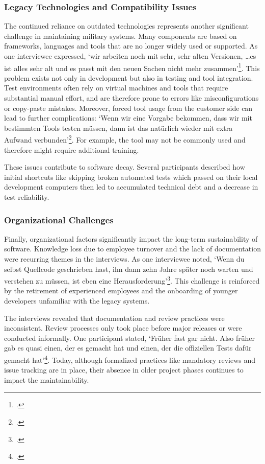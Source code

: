 \subsubsection{Legacy Technologies and Compatibility Issues}
The continued reliance on outdated technologies represents another significant challenge in maintaining military systems. Many components are based on frameworks, languages and tools that are no longer widely used or supported.
As one interviewee expressed, `wir arbeiten noch mit sehr, sehr alten Versionen, \ldots es ist alles sehr alt und es passt mit den neuen Sachen nicht mehr zusammen'\footcite{Interview12025}.
This problem exists not only in development but also in testing and tool integration. Test environments often rely on virtual machines and tools that require substantial manual effort, and are therefore prone to errors like misconfigurations or copy-paste mistakes.
Moreover, forced tool usage from the customer side can lead to further complications: `Wenn wir eine Vorgabe bekommen, dass wir mit bestimmten Tools testen müssen, dann ist das natürlich wieder mit extra Aufwand verbunden'\footcite{Interview32025}. For example, the tool may not be commonly used and therefore might require additional training.

These issues contribute to software decay. Several participants described how initial shortcuts like skipping broken automated tests which passed on their local development computers then led to accumulated technical debt and a decrease in test reliability.

\subsubsection{Organizational Challenges}
Finally, organizational factors significantly impact the long-term sustainability of software. Knowledge loss due to employee turnover and the lack of documentation were recurring themes in the interviews.
As one interviewee noted, `Wenn du selbst Quellcode geschrieben hast, ihn dann zehn Jahre später noch warten und verstehen zu müssen, ist eben eine Herausforderung'\footcite{Interview22025}. This challenge is reinforced by the retirement of experienced employees and the onboarding of younger developers
unfamiliar with the legacy systems.

The interviews revealed that documentation and review practices were inconsistent. Review processes only took place before major releases or were conducted informally. One participant stated,
`Früher fast gar nicht. Also früher gab es quasi einen, der es gemacht hat und einen, der die offiziellen Tests dafür gemacht hat'\footcite{Interview12025}. Today, although formalized practices like mandatory reviews and issue tracking are in place, their absence in older project 
phases continues to impact the maintainability. 

